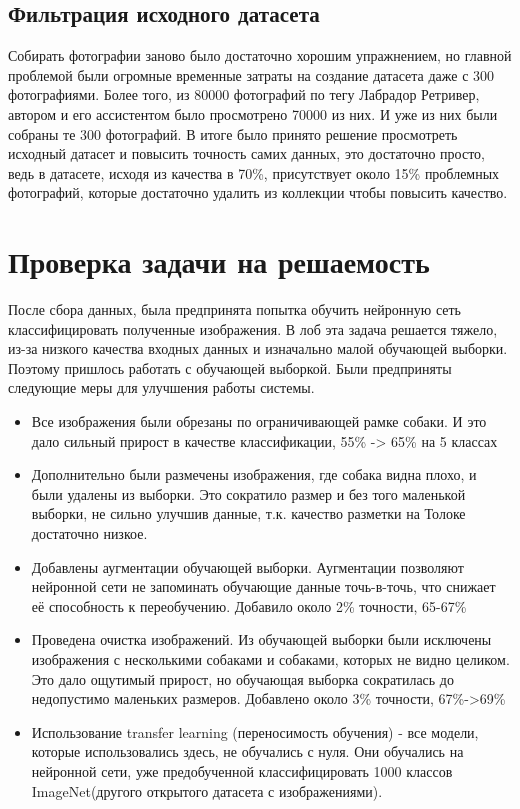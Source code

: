 \subsection{Фильтрация исходного датасета} \label{subsect3_1_2}
Собирать фотографии заново было достаточно хорошим упражнением, но главной проблемой были огромные временные затраты на создание датасета даже с 300 фотографиями. Более того, из 80000 фотографий по тегу Лабрадор Ретривер, автором и его ассистентом было просмотрено 70000 из них. И уже из них были собраны те 300 фотографий.
В итоге было принято решение просмотреть исходный датасет и повысить точность самих данных, это достаточно просто, ведь в датасете, исходя из качества в 70\%, присутствует около 15\% проблемных фотографий, которые достаточно удалить из коллекции чтобы повысить качество.

\section{Проверка задачи на решаемость} \label{sect3_2}
После сбора данных, была предпринята попытка обучить нейронную сеть классифицировать полученные изображения. В лоб эта задача решается тяжело, из-за низкого качества входных данных и изначально малой обучающей выборки. Поэтому пришлось работать с обучающей выборкой. Были предприняты следующие меры для улучшения работы системы.
\begin{itemize}
    \item Все изображения были обрезаны по ограничивающей рамке собаки. И это дало сильный прирост в качестве классификации, 55\% -> 65\% на 5 классах
    \item Дополнительно были размечены изображения, где собака видна плохо, и были удалены из выборки. Это сократило размер и без того маленькой выборки, не сильно улучшив данные, т.к. качество разметки на Толоке достаточно низкое.
    \item Добавлены аугментации обучающей выборки. Аугментации позволяют нейронной сети не запоминать обучающие данные точь-в-точь, что снижает её способность к переобучению. Добавило около 2\% точности, 65-67\%
    \item Проведена очистка изображений. Из обучающей выборки были исключены изображения с несколькими собаками и собаками, которых не видно целиком. Это дало ощутимый прирост, но обучающая выборка сократилась до недопустимо маленьких размеров. Добавлено около 3\% точности, 67\%->69\%
    \item Использование transfer learning (переносимость обучения) - все модели, которые использовались здесь, не обучались с нуля. Они обучались на нейронной сети, уже предобученной классифицировать 1000 классов ImageNet(другого открытого датасета с изображениями).

\end{itemize}

